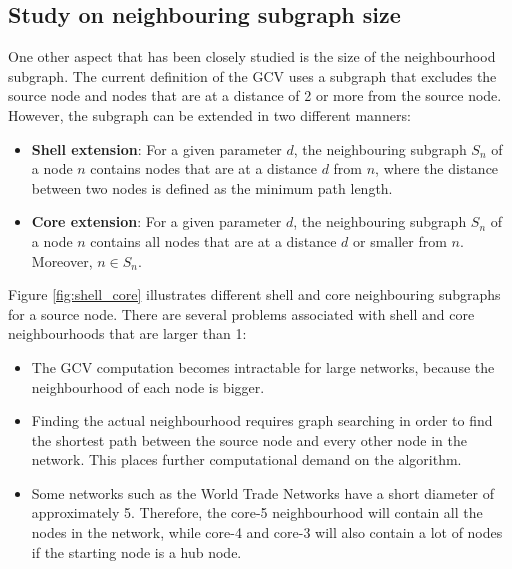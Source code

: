 \subsection{Study on neighbouring subgraph size}
\label{sec:neigh_subgr_size}

One other aspect that has been closely studied is the size of the neighbourhood subgraph. The current definition of the GCV uses a subgraph that excludes the source node and nodes that are at a distance of 2 or more from the source node. However, the subgraph can be extended in two different manners:
\begin{itemize}
 \item \textbf{Shell extension}: For a given parameter $d$, the neighbouring subgraph $S_n$ of a node $n$ contains nodes that are at a distance $d$ from $n$, where the distance between two nodes is defined as the minimum path length.
 \item \textbf{Core extension}: For a given parameter $d$, the neighbouring subgraph $S_n$ of a node $n$ contains all nodes that are at a distance $d$ or smaller from $n$. Moreover, $n \in S_n $.
\end{itemize}

Figure \ref{fig:shell_core} illustrates different shell and core neighbouring subgraphs for a source node. There are several  problems associated with shell and core neighbourhoods that are larger than 1:
\begin{itemize}
 \item The GCV computation becomes intractable for large networks, because the neighbourhood of each node is bigger.
 \item Finding the actual neighbourhood requires graph searching in order to find the shortest path between the source node and every other node in the network. This places further computational demand on the algorithm.
 \item Some networks such as the World Trade Networks have a short diameter of approximately 5. Therefore, the core-5 neighbourhood will contain all the nodes in the network, while core-4 and core-3 will also contain a lot of nodes if the starting node is a hub node.
\end{itemize}


